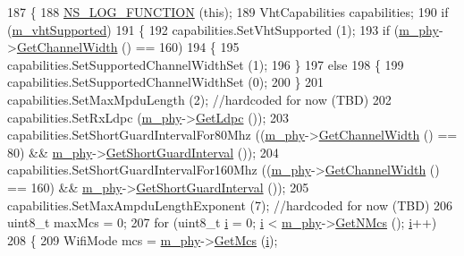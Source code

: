 \begin{DoxyCode}
187 \{
188   \hyperlink{log-macros-disabled_8h_a90b90d5bad1f39cb1b64923ea94c0761}{NS\_LOG\_FUNCTION} (\textcolor{keyword}{this});
189   VhtCapabilities capabilities;
190   \textcolor{keywordflow}{if} (\hyperlink{classns3_1_1RegularWifiMac_a151f330fdeb3f83f9ec7cf07537f0e86}{m\_vhtSupported})
191     \{
192       capabilities.SetVhtSupported (1);
193       \textcolor{keywordflow}{if} (\hyperlink{classns3_1_1RegularWifiMac_a1a6dad8eb0a057a4e1b459f518457a4c}{m\_phy}->\hyperlink{classns3_1_1WifiPhy_a4a5d5009b3b3308f2baeed42a2007189}{GetChannelWidth} () == 160)
194         \{
195           capabilities.SetSupportedChannelWidthSet (1);
196         \}
197       \textcolor{keywordflow}{else}
198         \{
199           capabilities.SetSupportedChannelWidthSet (0);
200         \}
201       capabilities.SetMaxMpduLength (2); \textcolor{comment}{//hardcoded for now (TBD)}
202       capabilities.SetRxLdpc (\hyperlink{classns3_1_1RegularWifiMac_a1a6dad8eb0a057a4e1b459f518457a4c}{m\_phy}->\hyperlink{classns3_1_1WifiPhy_a36c9adcf0b1f2229891c079016bfcb1b}{GetLdpc} ());
203       capabilities.SetShortGuardIntervalFor80Mhz ((\hyperlink{classns3_1_1RegularWifiMac_a1a6dad8eb0a057a4e1b459f518457a4c}{m\_phy}->\hyperlink{classns3_1_1WifiPhy_a4a5d5009b3b3308f2baeed42a2007189}{GetChannelWidth} () == 80) && 
      \hyperlink{classns3_1_1RegularWifiMac_a1a6dad8eb0a057a4e1b459f518457a4c}{m\_phy}->\hyperlink{classns3_1_1WifiPhy_ae907e448ace9df4d647c8f97bbec23fc}{GetShortGuardInterval} ());
204       capabilities.SetShortGuardIntervalFor160Mhz ((\hyperlink{classns3_1_1RegularWifiMac_a1a6dad8eb0a057a4e1b459f518457a4c}{m\_phy}->\hyperlink{classns3_1_1WifiPhy_a4a5d5009b3b3308f2baeed42a2007189}{GetChannelWidth} () == 160) 
      && \hyperlink{classns3_1_1RegularWifiMac_a1a6dad8eb0a057a4e1b459f518457a4c}{m\_phy}->\hyperlink{classns3_1_1WifiPhy_ae907e448ace9df4d647c8f97bbec23fc}{GetShortGuardInterval} ());
205       capabilities.SetMaxAmpduLengthExponent (7); \textcolor{comment}{//hardcoded for now (TBD)}
206       uint8\_t maxMcs = 0;
207       \textcolor{keywordflow}{for} (uint8\_t \hyperlink{bernuolliDistribution_8m_a6f6ccfcf58b31cb6412107d9d5281426}{i} = 0; \hyperlink{bernuolliDistribution_8m_a6f6ccfcf58b31cb6412107d9d5281426}{i} < \hyperlink{classns3_1_1RegularWifiMac_a1a6dad8eb0a057a4e1b459f518457a4c}{m\_phy}->\hyperlink{classns3_1_1WifiPhy_aede1b3de380510e387aaafcfda7a0db0}{GetNMcs} (); \hyperlink{bernuolliDistribution_8m_a6f6ccfcf58b31cb6412107d9d5281426}{i}++)
208         \{
209           WifiMode mcs = \hyperlink{classns3_1_1RegularWifiMac_a1a6dad8eb0a057a4e1b459f518457a4c}{m\_phy}->\hyperlink{classns3_1_1WifiPhy_a6a8740a6fbb7ff618c80e0a0867467fd}{GetMcs} (\hyperlink{bernuolliDistribution_8m_a6f6ccfcf58b31cb6412107d9d5281426}{i});

\end{DoxyCode}

